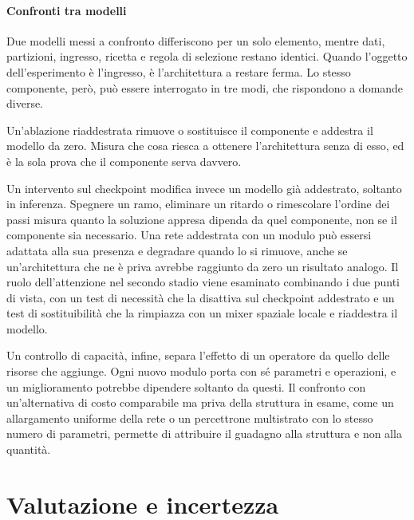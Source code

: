 \paragraph{Confronti tra modelli}
\label{sec:disegno_controlli}
Due modelli messi a confronto differiscono per un solo elemento, mentre dati, partizioni, ingresso, ricetta e regola di selezione restano identici. Quando l'oggetto dell'esperimento è l'ingresso, è l'architettura a restare ferma. Lo stesso componente, però, può essere interrogato in tre modi, che rispondono a domande diverse.

Un'ablazione riaddestrata rimuove o sostituisce il componente e addestra il modello da zero. Misura che cosa riesca a ottenere l'architettura senza di esso, ed è la sola prova che il componente serva davvero.

Un intervento sul checkpoint modifica invece un modello già addestrato, soltanto in inferenza. Spegnere un ramo, eliminare un ritardo o rimescolare l'ordine dei passi misura quanto la soluzione appresa dipenda da quel componente, non se il componente sia necessario. Una rete addestrata con un modulo può essersi adattata alla sua presenza e degradare quando lo si rimuove, anche se un'architettura che ne è priva avrebbe raggiunto da zero un risultato analogo. Il ruolo dell'attenzione nel secondo stadio viene esaminato combinando i due punti di vista, con un test di necessità che la disattiva sul checkpoint addestrato e un test di sostituibilità che la rimpiazza con un mixer spaziale locale e riaddestra il modello.

Un controllo di capacità, infine, separa l'effetto di un operatore da quello delle risorse che aggiunge. Ogni nuovo modulo porta con sé parametri e operazioni, e un miglioramento potrebbe dipendere soltanto da questi. Il confronto con un'alternativa di costo comparabile ma priva della struttura in esame, come un allargamento uniforme della rete o un percettrone multistrato con lo stesso numero di parametri, permette di attribuire il guadagno alla struttura e non alla quantità.



\section{Valutazione e incertezza}
\label{sec:metriche_valutazione}

